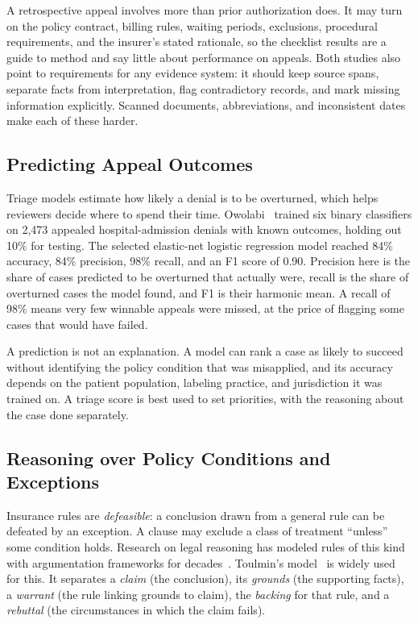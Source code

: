 \documentclass[conference]{IEEEtran}
\begin{document}
A retrospective appeal involves more than prior authorization does. It may turn on the policy contract, billing rules, waiting periods, exclusions, procedural requirements, and the insurer's stated rationale, so the checklist results are a guide to method and say little about performance on appeals. Both studies also point to requirements for any evidence system: it should keep source spans, separate facts from interpretation, flag contradictory records, and mark missing information explicitly. Scanned documents, abbreviations, and inconsistent dates make each of these harder.

\subsection{Predicting Appeal Outcomes}
Triage models estimate how likely a denial is to be overturned, which helps reviewers decide where to spend their time. Owolabi~\cite{owolabi2025} trained six binary classifiers on 2,473 appealed hospital-admission denials with known outcomes, holding out 10\% for testing. The selected elastic-net logistic regression model reached 84\% accuracy, 84\% precision, 98\% recall, and an F1 score of 0.90. Precision here is the share of cases predicted to be overturned that actually were, recall is the share of overturned cases the model found, and F1 is their harmonic mean. A recall of 98\% means very few winnable appeals were missed, at the price of flagging some cases that would have failed.

A prediction is not an explanation. A model can rank a case as likely to succeed without identifying the policy condition that was misapplied, and its accuracy depends on the patient population, labeling practice, and jurisdiction it was trained on. A triage score is best used to set priorities, with the reasoning about the case done separately.

\subsection{Reasoning over Policy Conditions and Exceptions}
Insurance rules are \emph{defeasible}: a conclusion drawn from a general rule can be defeated by an exception. A clause may exclude a class of treatment ``unless'' some condition holds. Research on legal reasoning has modeled rules of this kind with argumentation frameworks for decades~\cite{prakken2015}. Toulmin's model~\cite{toulmin2003} is widely used for this. It separates a \emph{claim} (the conclusion), its \emph{grounds} (the supporting facts), a \emph{warrant} (the rule linking grounds to claim), the \emph{backing} for that rule, and a \emph{rebuttal} (the circumstances in which the claim fails).
\end{document}
